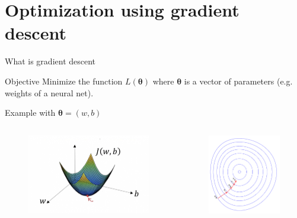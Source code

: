 \documentclass[handout]{beamer}
\begin{document}
\section{Optimization using gradient descent}
\begin{frame}{What is gradient descent}
\begin{block}{Objective}
Minimize the function $L(\boldsymbol{\theta})$ where $\boldsymbol{\theta}$ is a vector of parameters (e.g. weights of a neural net).
\end{block}
Example with $\boldsymbol{\theta} = (w, b)$
\begin{columns}

\begin{figure}
    \centering
    \includegraphics[width=.9\textwidth]{fig/L3/gradient-descent-convex-function.png}
\end{figure}

\begin{figure}
    \centering
    \includegraphics[width=.8\textwidth]{fig/L3/gradient-descent-range.png}
\end{figure}
\end{columns}

\end{frame}
\end{document}
